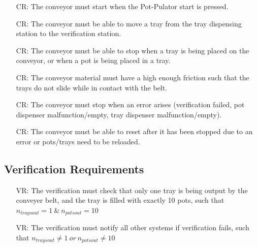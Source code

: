 \documentclass[12pt]{article}
\newcounter{creqnum} %
\newcounter{vreqnum} %
\newcounter{reqnum} %
\begin{document}
  \noindent \begin{itemize}
  
  \item[CR\refstepcounter{creqnum}\thecreqnum \label{R_Conveyor0}:] {The conveyor must
      start when the Pot-Pulator start is pressed.}

  \item[CR\refstepcounter{creqnum}\thecreqnum \label{R_Conveyor1}:] {The conveyor must
      be able to move a tray from the tray dispensing station to the verification station.}
  
  \item[CR\refstepcounter{creqnum}\thecreqnum \label{R_Conveyor2}:] {The conveyor must
      be able to stop when a tray is being placed on the conveyor, or when a pot is being
      placed in a tray.}
      
  \item[CR\refstepcounter{creqnum}\thecreqnum \label{R_Conveyor4}:] {The conveyor material 
      must have a high enough friction such that the trays do not slide while in contact with
      the belt.}
  
  \item[CR\refstepcounter{creqnum}\thecreqnum \label{R_Conveyor5}:] {The conveyor must
      stop when an error arises (verification failed, pot dispenser malfunction/empty, tray dispenser
      malfunction/empty).}
  \item[CR\refstepcounter{creqnum}\thecreqnum \label{R_Conveyor6}:] {The conveyor must
      be able to reset after it has been stopped due to an error or pots/trays need to
      be reloaded.}
  
  \end{itemize}
  
  \subsection{Verification Requirements}
  
  \noindent \begin{itemize}
  
  \item[VR\refstepcounter{vreqnum}\thevreqnum \label{R_Verification1}:] {The verification must
      check that only one tray is being output by the conveyer belt, and the tray is
      filled with exactly 10 pots, such that $n_{traysout}=1\ \&\ n_{potsout}=10$}
  
  \item[VR\refstepcounter{vreqnum}\thevreqnum \label{R_Verification2}:] {The verification must
      notify all other systems if verification fails, such that $n_{traysout}\neq1\ or\ n_{potsout}\neq10$}
  
  \end{itemize}
  
\end{document}
